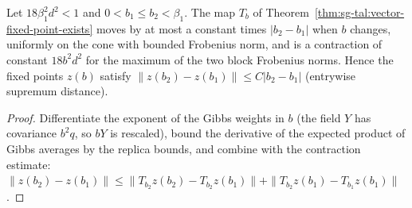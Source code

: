 \begin{theorem}\label{thm:sg-tal:vector-fixed-point-beta}
\leanok
{}
Let $18\beta_1^2d^2<1$ and $0<b_1\le b_2<\beta_1$. The map $T_b$ of Theorem~\ref{thm:sg-tal:vector-fixed-point-exists} moves by at most a constant times $|b_2-b_1|$ when $b$ changes, uniformly on the cone with bounded Frobenius norm, and is a contraction of constant $18b^2d^2$ for the maximum of the two block Frobenius norms. Hence the fixed points $z(b)$ satisfy $\|z(b_2)-z(b_1)\|\le C|b_2-b_1|$ (entrywise supremum distance).
\end{theorem}
\begin{proof}
\leanok
Differentiate the exponent of the Gibbs weights in $b$ (the field $Y$ has covariance $b^2q$, so $bY$ is rescaled), bound the derivative of the expected product of Gibbs averages by the replica bounds, and combine with the contraction estimate: $\|z(b_2)-z(b_1)\|\le\|T_{b_2}z(b_2)-T_{b_2}z(b_1)\|+\|T_{b_2}z(b_1)-T_{b_1}z(b_1)\|$.
\end{proof}

